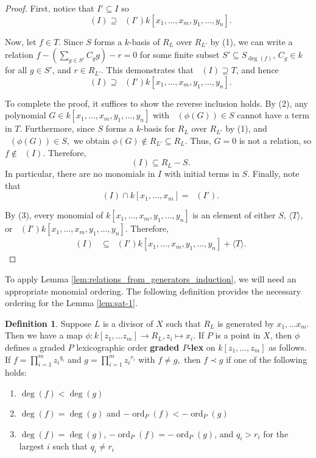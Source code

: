 \documentclass{amsart}
\theoremstyle{plain}
\theoremstyle{definition}
\newtheorem{defn}[thm]{Definition}
\theoremstyle{remark}
\numberwithin{equation}{section}
\DeclareMathOperator{\ord}{ord}
\newcommand{\halfcan}{L}
\DeclareMathOperator{\initial}{in_\prec}
\begin{document}
\begin{proof}
First, notice that $I'\subseteq I$ so 
\[
	\initial(I)\supseteq \initial(I')k[x_1, \ldots, x_m, y_1, \ldots, y_n].
\]

Now, let $f\in T$.  Since $S$ forms a $k$-basis of $R_{\halfcan}$ over $R_{\halfcan'}$ by (1), we can write a relation $f - (\sum_{g\in S'} C_g g)-r=0$ for some finite subset $S'\subseteq S_{\deg(f)}$, $C_g\in k$ for all $g\in S'$, and $r\in R_{\halfcan'}$.  This demonstrates that $\initial(I) \supseteq T$, and hence
\[
	\initial(I)\supseteq \initial(I')k[x_1, \ldots, x_m, y_1, \ldots, y_n].
\]

To complete the proof, it suffices to show the reverse inclusion holds. By (2), any polynomial $G\in k[x_1, \ldots, x_m, y_1, \ldots, y_n]$ with $\initial(\phi(G)) \in S$ cannot have a term in $T$.  Furthermore, since $S$ forms a $k$-basis for $R_\halfcan$ over $R_{\halfcan'}$ by (1), and $\initial(\phi(G)) \in S,$ we obtain $\phi(G) \notin R_{\halfcan'} \subseteq R_\halfcan.$ Thus, $G=0$ is not a relation, so $f\not\in \initial(I)$.  Therefore, 
\[
	\initial(I)\subseteq R_\halfcan-S.
\]
In particular, there are no monomials in $I$ with initial terms in $S$.
Finally, note that
\[
	\initial(I) \cap k[x_1, \ldots, x_m] = \initial(I').
\]

By (3), every monomial of $k[x_1, \ldots, x_m, y_1, \ldots, y_n]$ is an element of either $S$, $\langle T\rangle$, or $\initial(I') k[x_1, \ldots, x_m, y_1, \ldots, y_n].$ Therefore,
\begin{align*}
	\initial(I) & \subseteq \initial(I') k[x_1, \ldots, x_m, y_1, \ldots, y_n] + \langle T \rangle.
\end{align*}
\end{proof}

To apply Lemma \ref{lem:relations_from_generators_induction}, we will need an appropriate monomial ordering.
The following definition provides the necessary ordering for the Lemma \ref{lem:sat-1}.
\begin{defn}
\label{defn:graded-p-lex}
Suppose $\halfcan$ is a divisor of $X$ such that $R_\halfcan$ is generated by $x_1, \ldots x_m$.  Then we have a map $\phi: k[z_1, \ldots z_m] \rightarrow R_\halfcan, z_i\mapsto x_i$. If $P$ is a point in $X$, then $\phi$ defines a graded $P$ lexicographic order {\bf{graded $P$-lex}} on $k[z_1, \ldots, z_m]$ as follows.
If $f=\prod_{i=1}^m {z_i}^{q_i}$ and $g=\prod_{i=1}^m {z_i}^{r_i}$ with $f \neq g,$ then $f\prec g$ if one of the following holds:
\begin{enumerate}
\item $\deg(f) < \deg(g)$
\item $\deg(f) = \deg(g)$ and $-\ord_P(f) < -\ord_P(g)$
\item $\deg(f) = \deg(g)$, $-\ord_P(f) = -\ord_P(g)$, and $q_i > r_i$ for the largest $i$ such that $q_i\ne r_i$
\end{enumerate}
\end{defn}
\end{document}
